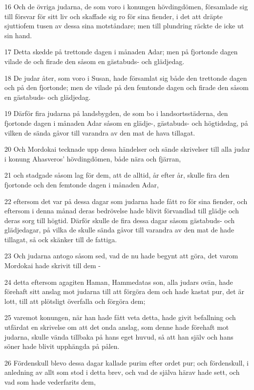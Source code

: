 \par 16 Och de övriga judarna, de som voro i konungen hövdingdömen, församlade sig till försvar för sitt liv och skaffade sig ro för sina fiender, i det att dräpte sjuttiofem tusen av dessa sina motståndare; men till plundring räckte de icke ut sin hand.
\par 17 Detta skedde på trettonde dagen i månaden Adar; men på fjortonde dagen vilade de och firade den såsom en gästabuds- och glädjedag.
\par 18 De judar åter, som voro i Susan, hade församlat sig både den trettonde dagen och på den fjortonde; men de vilade på den femtonde dagen och firade den såsom en gästabuds- och glädjedag.
\par 19 Därför fira judarna på landsbygden, de som bo i landsortsstäderna, den fjortonde dagen i månaden Adar såsom en glädje-, gästabuds- och högtidsdag, på vilken de sända gåvor till varandra av den mat de hava tillagat.
\par 20 Och Mordokai tecknade upp dessa händelser och sände skrivelser till alla judar i konung Ahasveros' hövdingdömen, både nära och fjärran,
\par 21 och stadgade såsom lag för dem, att de alltid, år efter år, skulle fira den fjortonde och den femtonde dagen i månaden Adar,
\par 22 eftersom det var på dessa dagar som judarna hade fått ro för sina fiender, och eftersom i denna månad deras bedrövelse hade blivit förvandlad till glädje och deras sorg till högtid. Därför skulle de fira dessa dagar såsom gästabuds- och glädjedagar, på vilka de skulle sända gåvor till varandra av den mat de hade tillagat, så ock skänker till de fattiga.
\par 23 Och judarna antogo såsom sed, vad de nu hade begynt att göra, det varom Mordokai hade skrivit till dem -
\par 24 detta eftersom agagiten Haman, Hammedatas son, alla judars ovän, hade förehaft sitt anslag mot judarna till att förgöra dem och hade kastat pur, det är lott, till att plötsligt överfalla och förgöra dem;
\par 25 varemot konungen, när han hade fått veta detta, hade givit befallning och utfärdat en skrivelse om att det onda anslag, som denne hade förehaft mot judarna, skulle vända tillbaka på hans eget huvud, så att han själv och hans söner hade blivit upphängda på pålen.
\par 26 Fördenskull blevo dessa dagar kallade purim efter ordet pur; och fördenskull, i anledning av allt som stod i detta brev, och vad de själva härav hade sett, och vad som hade vederfarits dem,

